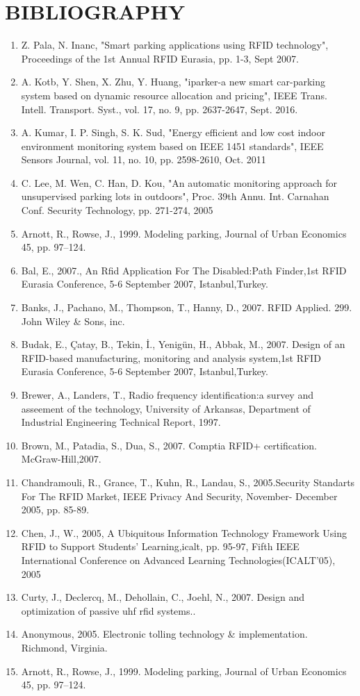 \documentclass[12pt,a4paper]{report}
\begin{document}
\section*{BIBLIOGRAPHY}
\begin{enumerate}
	\item Z. Pala, N. Inanc, "Smart parking applications using RFID technology", Proceedings of the 1st Annual RFID Eurasia, pp. 1-3, Sept 2007.
	\item A. Kotb, Y. Shen, X. Zhu, Y. Huang, "iparker-a new smart car-parking system based on dynamic resource allocation and pricing", IEEE Trans. Intell. Transport. Syst., vol. 17, no. 9, pp. 2637-2647, Sept. 2016.
	\item A. Kumar, I. P. Singh, S. K. Sud, "Energy efficient and low cost indoor environment monitoring system based on IEEE 1451 standards", IEEE Sensors Journal, vol. 11, no. 10, pp. 2598-2610, Oct. 2011
	\item C. Lee, M. Wen, C. Han, D. Kou, "An automatic monitoring approach for unsupervised parking lots in outdoors", Proc. 39th Annu. Int. Carnahan Conf. Security Technology, pp. 271-274, 2005
	\item Arnott, R., Rowse, J., 1999. Modeling parking, Journal of Urban Economics 45, pp. 97–124.
	\item Bal, E., 2007., An Rfid Application For The Disabled:Path Finder,1st RFID Eurasia Conference, 5-6
	September 2007, Istanbul,Turkey.
	\item Banks, J., Pachano, M., Thompson, T., Hanny, D., 2007. RFID Applied. 299. John Wiley \& Sons, inc.
	\item Budak, E., Çatay, B., Tekin, İ., Yenigün, H., Abbak, M., 2007. Design of an RFID-based manufacturing,
	monitoring and analysis system,1st RFID Eurasia Conference, 5-6 September 2007, Istanbul,Turkey.
	\item Brewer, A., Landers, T., Radio frequency identification:a survey and asseement of the technology,
	University of Arkansas, Department of Industrial Engineering Technical Report, 1997.
	\item Brown, M., Patadia, S., Dua, S., 2007. Comptia RFID+ certification. McGraw-Hill,2007.
	\item Chandramouli, R., Grance, T., Kuhn, R., Landau, S., 2005.Security Standarts For The RFID Market,
	IEEE Privacy And Security, November- December 2005, pp. 85-89.
	\item Chen, J., W., 2005, A Ubiquitous Information Technology Framework Using RFID to Support Students'
	Learning,icalt, pp. 95-97, Fifth IEEE International Conference on Advanced Learning Technologies(ICALT'05), 2005
	\item Curty, J., Declercq, M., Dehollain, C., Joehl, N., 2007. Design and optimization of passive uhf rfid systems..
	\item Anonymous, 2005. Electronic tolling technology \& implementation. Richmond, Virginia.
	\item Arnott, R., Rowse, J., 1999. Modeling parking, Journal of Urban Economics 45, pp. 97–124.
\end{enumerate}
\newpage
\end{document}
